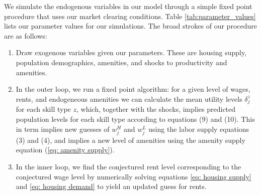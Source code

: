 \documentclass{article}
\begin{document}
We simulate the endogenous variables in our model through a simple fixed point procedure that uses our market clearing conditions. Table \ref{tab:parameter_values} lists our parameter values for our simulations. The broad strokes of our procedure are as follows: 
\begin{enumerate}
\item Draw exogenous variables given our parameters. These are housing supply, population demographics, amenities, and shocks to productivity and amenities. 
\item In the outer loop, we run a fixed point algorithm: for a given level of wages,  rents, and endogeneous amenities we can calculate the mean utility levels $\delta^z_{j}$ for each skill type $z$, which, together with the shocks, implies predicted population levels for each skill type according to equations (9) and (10). This in term implies new guesses of $w^H_{j}$ and $w^L_{j}$ using the labor supply equations (3) and (4), and implies a new level of amenities using the amenity supply equation (\ref{eq: amenity supply}).

\item In the inner loop, we find the conjectured rent level corresponding to the conjectured wage level by numerically solving equations \ref{eq: housing supply} and \ref{eq: housing demand} to yield an updated guess for rents. 
\end{enumerate}
\end{document}
